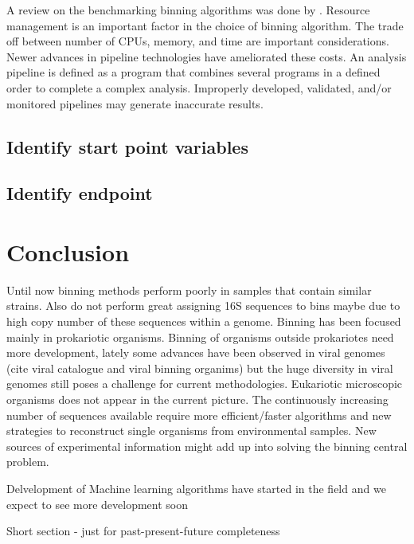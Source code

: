 \documentclass{article}
\begin{document}
A review on the benchmarking binning algorithms was done by .
Resource management is an important factor in the choice of binning algorithm.
The trade off between number of \glspl{CPU}, memory, and time are important considerations.
Newer advances in pipeline technologies have ameliorated these costs.
An analysis pipeline is defined as a program that combines several programs in a defined order to complete a complex analysis.
Improperly developed, validated, and/or monitored pipelines may generate inaccurate results.
\subsection{Identify start point variables} 

\subsection{Identify endpoint}

\section{Conclusion}
Until now binning methods perform poorly in samples that contain similar strains. Also do not perform great assigning 16S sequences to bins maybe due to high copy number of these sequences within a genome.
Binning has been focused mainly in prokariotic organisms. Binning of organisms outside prokariotes need more development, lately some advances have been observed in viral genomes  (cite viral catalogue and viral binning organims) but the huge diversity in viral genomes still poses a challenge for current methodologies. Eukariotic microscopic organisms does not appear in the current picture. 
The continuously increasing number of sequences available require more efficient/faster algorithms and new strategies to reconstruct single organisms from environmental samples.
New sources of experimental information might add up into solving the binning central problem.

Delvelopment of Machine learning algorithms have started in the field and we expect to see more development soon

Short section - just for past-present-future completeness


\end{document}
